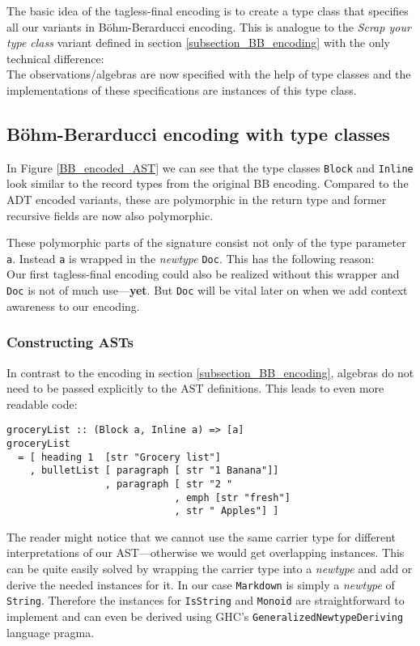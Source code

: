 The basic idea of the tagless-final encoding is to create a type class that
specifies all our variants in Böhm-Berarducci encoding. This is analogue to the
\emph{Scrap your type class} variant defined in section
\ref{subsection_BB_encoding} with the only technical difference:\\
The observations/algebras are now specified with the help of type classes and
the implementations of these specifications are instances of this type class.

\subsection{Böhm-Berarducci encoding with type classes}

In Figure \ref{BB_encoded_AST} we can see that the type classes \texttt{Block}
and \texttt{Inline} look similar to the record types from the original BB
encoding. Compared to the ADT encoded variants, these are polymorphic in the
return type and former recursive fields are now also polymorphic.

These polymorphic parts of the signature consist not only of the type parameter
\texttt{a}. Instead \texttt{a} is wrapped in the \emph{newtype} \texttt{Doc}.
This has the following reason:\\
Our first tagless-final encoding could also be realized without this wrapper and
\texttt{Doc} is not of much use—\textbf{yet}. But \texttt{Doc} will be vital
later on when we add context awareness to our encoding.

\subsubsection{Constructing ASTs}

In contrast to the encoding in section \ref{subsection_BB_encoding}, algebras do
not need to be passed explicitly to the AST definitions. This leads to even more readable code:

\begin{lstlisting}
groceryList :: (Block a, Inline a) => [a]
groceryList
  = [ heading 1  [str "Grocery list"]
    , bulletList [ paragraph [ str "1 Banana"]]
                 , paragraph [ str "2 "
                             , emph [str "fresh"]
                             , str " Apples"] ]
\end{lstlisting}

The reader might notice that we cannot use the same carrier type for different
interpretations of our AST—otherwise we would get overlapping instances. This
can be quite easily solved by wrapping the carrier type into a \emph{newtype}
and add or derive the needed instances for it. In our case \texttt{Markdown} is
simply a \emph{newtype} of \texttt{String}. Therefore the instances for
\texttt{IsString} and \texttt{Monoid} are straightforward to implement and can
even be derived using GHC’s \texttt{GeneralizedNewtypeDeriving} language pragma.

